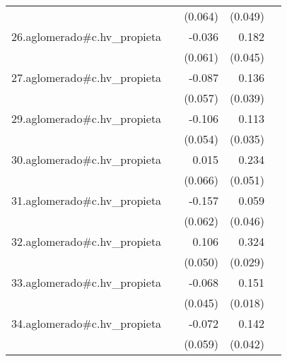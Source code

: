 {\begin{longtable}{l*{4}{D{.}{.}{-1}}}
            &                     &     (0.064)         &     (0.049)         &                     \\
\addlinespace
26.aglomerado#c.hv\_propieta&                     &      -0.036         &       0.182\sym{***}&                     \\
            &                     &     (0.061)         &     (0.045)         &                     \\
\addlinespace
27.aglomerado#c.hv\_propieta&                     &      -0.087         &       0.136\sym{***}&                     \\
            &                     &     (0.057)         &     (0.039)         &                     \\
\addlinespace
29.aglomerado#c.hv\_propieta&                     &      -0.106         &       0.113\sym{**} &                     \\
            &                     &     (0.054)         &     (0.035)         &                     \\
\addlinespace
30.aglomerado#c.hv\_propieta&                     &       0.015         &       0.234\sym{***}&                     \\
            &                     &     (0.066)         &     (0.051)         &                     \\
\addlinespace
31.aglomerado#c.hv\_propieta&                     &      -0.157\sym{*}  &       0.059         &                     \\
            &                     &     (0.062)         &     (0.046)         &                     \\
\addlinespace
32.aglomerado#c.hv\_propieta&                     &       0.106\sym{*}  &       0.324\sym{***}&                     \\
            &                     &     (0.050)         &     (0.029)         &                     \\
\addlinespace
33.aglomerado#c.hv\_propieta&                     &      -0.068         &       0.151\sym{***}&                     \\
            &                     &     (0.045)         &     (0.018)         &                     \\
\addlinespace
34.aglomerado#c.hv\_propieta&                     &      -0.072         &       0.142\sym{***}&                     \\
            &                     &     (0.059)         &     (0.042)         &                     \\

\end{longtable}}
